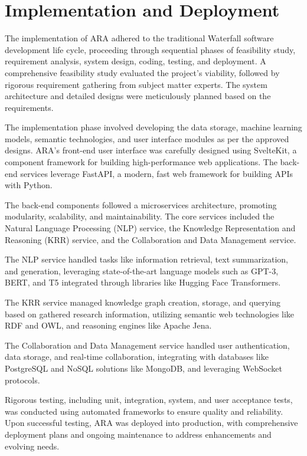 \documentclass[a4paper,conference]{IEEEtran}
\begin{document}
\section{Implementation and Deployment}

The implementation of ARA adhered to the traditional Waterfall software development life cycle, proceeding through sequential phases of feasibility study, requirement analysis, system design, coding, testing, and deployment. A comprehensive feasibility study evaluated the project's viability, followed by rigorous requirement gathering from subject matter experts. The system architecture and detailed designs were meticulously planned based on the requirements.

The implementation phase involved developing the data storage, machine learning models, semantic technologies, and user interface modules as per the approved designs. ARA's front-end user interface was carefully designed using SvelteKit, a component framework for building high-performance web applications. The back-end services leverage FastAPI, a modern, fast web framework for building APIs with Python.

The back-end components followed a microservices architecture, promoting modularity, scalability, and maintainability. The core services included the Natural Language Processing (NLP) service, the Knowledge Representation and Reasoning (KRR) service, and the Collaboration and Data Management service.

The NLP service handled tasks like information retrieval, text summarization, and generation, leveraging state-of-the-art language models such as GPT-3, BERT, and T5 integrated through libraries like Hugging Face Transformers.

The KRR service managed knowledge graph creation, storage, and querying based on gathered research information, utilizing semantic web technologies like RDF and OWL, and reasoning engines like Apache Jena.

The Collaboration and Data Management service handled user authentication, data storage, and real-time collaboration, integrating with databases like PostgreSQL and NoSQL solutions like MongoDB, and leveraging WebSocket protocols.

Rigorous testing, including unit, integration, system, and user acceptance tests, was conducted using automated frameworks to ensure quality and reliability. Upon successful testing, ARA was deployed into production, with comprehensive deployment plans and ongoing maintenance to address enhancements and evolving needs.
\end{document}
